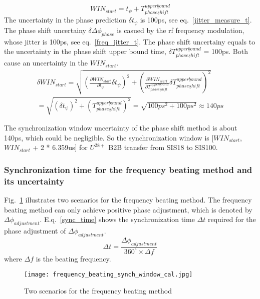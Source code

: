 \begin{equation}
WIN_{start} = t_{\psi} + T_{phase\underline shift}^{upper\underline bound} \label{Phase_win}
\end{equation}
The uncertainty in the phase prediction $\delta t_{\psi}$ is 100ps, see eq.~\ref{jitter_measure_t}. The phase shift uncertainy $\delta \Delta \phi_{phase}$ is casued by the rf frequency modulation, whose jitter is 100ps, see eq.~\ref{freq_jitter_t}. The phase shift uncertainy equals to the uncertainty in the phase shift upper bound time, $\delta T_{phase\underline shift}^{upper\underline bound}$ = 100ps. Both cause an uncertainty in the $WIN_{start}$.
\begin{equation}
\begin{aligned}
\delta WIN_{start} =\sqrt {(\frac {\partial WIN_{start}}{\partial t_{\psi}}\delta t_{\psi})^2 + (\frac {\partial WIN_{start}}{\partial T_{phase\underline shift}^{upper\underline bound}}\delta T_{phase\underline shift}^{upper\underline bound})^2} \\
 =\sqrt {(\delta t_{\psi})^2+(T_{phase\underline shift}^{upper\underline bound})^2} =\sqrt { 100ps^2+100ps^2}\approx 140ps \label{Phase_uncertainty}
\end{aligned}
\end{equation}

The synchronization window uncertainty of the phase shift method is about 140ps, which could be negligible. So the synchronization window is [$WIN_{start}$, $WIN_{start}$ + 2 * 6.359us] for $U^{28+}$ B2B transfer from SIS18 to SIS100.
\subsubsection{ Synchronization time for the frequency beating method and its uncertainty}
Fig.~\ref{frequency_beating} illustrates two scenarios for the frequency beating method. The frequency beating method can only achieve positive phase adjustment, which is denoted by $\Delta \phi_{adjustment}$. E.q.~\ref{sync_time} shows the synchronization time $\Delta  t$ required for the phase adjustment of $\Delta \phi_{adjustment}$.
\begin{equation}
	 \Delta t = \frac {\Delta \phi_{adjustment}}{{360^\circ} \times {\Delta f}} \label {sync_time}
   \end{equation}
where $\Delta f$ is the beating frequency.
\begin{figure}[!htb]
   \centering   
   \texttt{[image: frequency\_beating\_synch\_window\_cal.jpg]}
   \caption{Two scenarios for the frequency beating method}
   \label{frequency_beating}
\end{figure}

